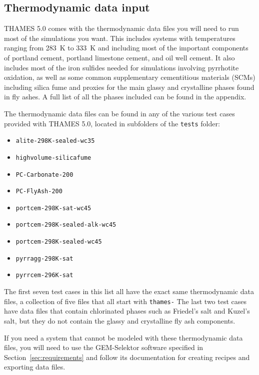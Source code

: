 \documentclass{article}
\begin{document}

\subsection{\label{sec:thermodata} Thermodynamic data input}
THAMES 5.0 comes with the thermodynamic data files you will need to run most
of the simulations you want. This includes systems with temperatures ranging
from \qty{283}{\kelvin} to \qty{333}{\kelvin} and including most of the
important components of portland cement, portland limestone cement, and oil well
cement. It also includes most of the iron sulfides needed for simulations
involving pyrrhotite oxidation, as well as some common supplementary
cementitious materials (SCMs) including silica fume and proxies for the main
glassy and crystalline phases found in fly ashes. A full list of all the phases
included can be found in the appendix.

The thermodynamic data files can be found in any of the various test cases
provided with THAMES 5.0, located in subfolders of the \verb!tests! folder:
\begin{itemize}
	\item \verb!alite-298K-sealed-wc35!
	\item \verb!highvolume-silicafume!
	\item \verb!PC-Carbonate-200!
	\item \verb!PC-FlyAsh-200!
	\item \verb!portcem-298K-sat-wc45!
	\item \verb!portcem-298K-sealed-alk-wc45!
	\item \verb!portcem-298K-sealed-wc45!
	\item \verb!pyrragg-298K-sat!
	\item \verb!pyrrcem-296K-sat!
\end{itemize}
The first seven test cases in this list all have the exact same thermodynamic
data files, a collection of five files that all start with \verb!thames-!
The last two test cases have data files that contain chlorinated phases such
as Friedel's salt and Kuzel's salt, but they do not contain the glassy and
crystalline fly ash components.

If you need a system that cannot be modeled with these thermodynamic
data files, you will need to use the GEM-Selektor software specified in
Section~\ref{sec:requirements} and follow its documentation for creating
recipes and exporting data files.

\normalsize{ }
\end{document}
